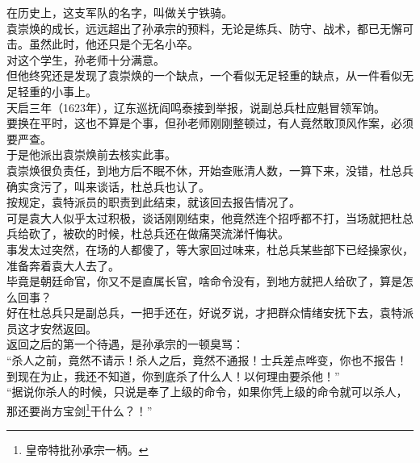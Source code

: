 \begin{multicols}{\theparacolNo}
在历史上，这支军队的名字，叫做关宁铁骑。\\

袁崇焕的成长，远远超出了孙承宗的预料，无论是练兵、防守、战术，都已无懈可击。虽然此时，他还只是个无名小卒。\\

对这个学生，孙老师十分满意。\\

但他终究还是发现了袁崇焕的一个缺点，一个看似无足轻重的缺点，从一件看似无足轻重的小事上。\\

天启三年（1623年），辽东巡抚阎鸣泰接到举报，说副总兵杜应魁冒领军饷。\\

要换在平时，这也不算是个事，但孙老师刚刚整顿过，有人竟然敢顶风作案，必须要严查。\\

于是他派出袁崇焕前去核实此事。\\

袁崇焕很负责任，到地方后不眠不休，开始查账清人数，一算下来，没错，杜总兵确实贪污了，叫来谈话，杜总兵也认了。\\

按规定，袁特派员的职责到此结束，就该回去报告情况了。\\

可是袁大人似乎太过积极，谈话刚刚结束，他竟然连个招呼都不打，当场就把杜总兵给砍了，被砍的时候，杜总兵还在做痛哭流涕忏悔状。\\

事发太过突然，在场的人都傻了，等大家回过味来，杜总兵某些部下已经操家伙，准备奔着袁大人去了。\\

毕竟是朝廷命官，你又不是直属长官，啥命令没有，到地方就把人给砍了，算是怎么回事？\\

好在杜总兵只是副总兵，一把手还在，好说歹说，才把群众情绪安抚下去，袁特派员这才安然返回。\\

返回之后的第一个待遇，是孙承宗的一顿臭骂：\\

“杀人之前，竟然不请示！杀人之后，竟然不通报！士兵差点哗变，你也不报告！到现在为止，我还不知道，你到底杀了什么人！以何理由要杀他！”\\

“据说你杀人的时候，只说是奉了上级的命令，如果你凭上级的命令就可以杀人，那还要尚方宝剑\footnote{皇帝特批孙承宗一柄。}干什么？！”\\


\end{multicols}
